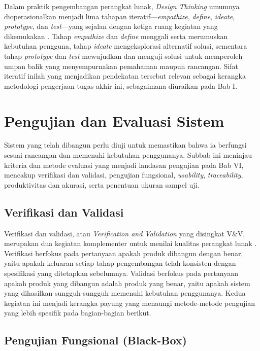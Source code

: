 Dalam praktik pengembangan perangkat lunak, \textit{Design Thinking} umumnya dioperasionalkan menjadi lima tahapan iteratif---\textit{empathize}, \textit{define}, \textit{ideate}, \textit{prototype}, dan \textit{test}---yang sejalan dengan ketiga ruang kegiatan yang dikemukakan \textcite{brown2008}. Tahap \textit{empathize} dan \textit{define} menggali serta merumuskan kebutuhan pengguna, tahap \textit{ideate} mengeksplorasi alternatif solusi, sementara tahap \textit{prototype} dan \textit{test} mewujudkan dan menguji solusi untuk memperoleh umpan balik yang menyempurnakan pemahaman maupun rancangan. Sifat iteratif inilah yang menjadikan pendekatan tersebut relevan sebagai kerangka metodologi pengerjaan tugas akhir ini, sebagaimana diuraikan pada Bab I.

\section{Pengujian dan Evaluasi Sistem}
\label{sec:pengujian-evaluasi}

Sistem yang telah dibangun perlu diuji untuk memastikan bahwa ia berfungsi sesuai rancangan dan memenuhi kebutuhan penggunanya. Subbab ini meninjau kriteria dan metode evaluasi yang menjadi landasan pengujian pada Bab VI, mencakup verifikasi dan validasi, pengujian fungsional, \textit{usability}, \textit{traceability}, produktivitas dan akurasi, serta penentuan ukuran sampel uji.

\subsection{Verifikasi dan Validasi}

Verifikasi dan validasi, atau \textit{Verification and Validation} yang disingkat V\&V, merupakan dua kegiatan komplementer untuk menilai kualitas perangkat lunak \autocite{ieee2016}. Verifikasi berfokus pada pertanyaan apakah produk dibangun dengan benar, yaitu apakah keluaran setiap tahap pengembangan telah konsisten dengan spesifikasi yang ditetapkan sebelumnya. Validasi berfokus pada pertanyaan apakah produk yang dibangun adalah produk yang benar, yaitu apakah sistem yang dihasilkan sungguh-sungguh memenuhi kebutuhan penggunanya. Kedua kegiatan ini menjadi kerangka payung yang menaungi metode-metode pengujian yang lebih spesifik pada bagian-bagian berikut.

\subsection{Pengujian Fungsional (Black-Box)}

